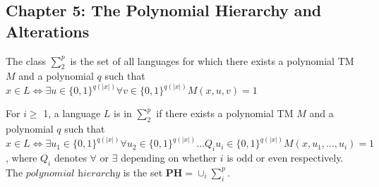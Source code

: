 \subsection*{Chapter 5: The Polynomial Hierarchy and Alterations}
\begin{note}
The class $\sum_{2}^{p}$ is the set of all languages for which there exists a polynomial TM $M$
and a polynomial $q$ such that
$x \in L \iff \exists u \in \{0,1\}^{q(|x|)} \forall v \in \{0,1\}^{q(|x|)} M(x, u, v) = 1 $
\end{note}

\begin{note}
For $ i \geq$ 1, a language $L$ is in $\sum_{2}^{p}$ if there exists a polynomial TM $M$
and a polynomial $q$ such that
$x \in L \iff \exists u_{1} \in \{0,1\}^{q(|x|)} \forall u_{2} \in \{0,1\}^{q(|x|)} \ldots
Q_{i}u_{i} \in \{0,1\}^{q(|x|)} M(x, u_{1}, \ldots, u_{i}) = 1 $,
where $Q_i$ denotes $\forall$ or $\exists$ depending on whether $i$ is odd or even respectively.
The $\textit{polynomial hierarchy}$ is the set $\textbf{PH} = \cup_{i} \sum_{i}^{p}$.
\end{note}


